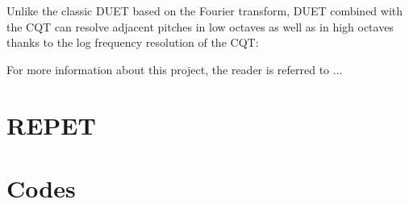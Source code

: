 \documentclass{article}
\begin{document}
Unlike the classic DUET based on the Fourier transform, DUET combined with the CQT can resolve adjacent pitches in low octaves as well as in high octaves thanks to the log frequency resolution of the CQT:


For more information about this project, the reader is referred to ...


\section{REPET}
\label{sec:repet}


\section{Codes}
\label{sec:codes}




\printbibheading[title={References},heading=bibnumbered]
\label{sec:refs}
\printbibliography[title={Patents},type=patent,heading=subbibnumbered]
\printbibliography[title={Journal Articles},type=article,heading=subbibnumbered]

%
%
\end{document}
